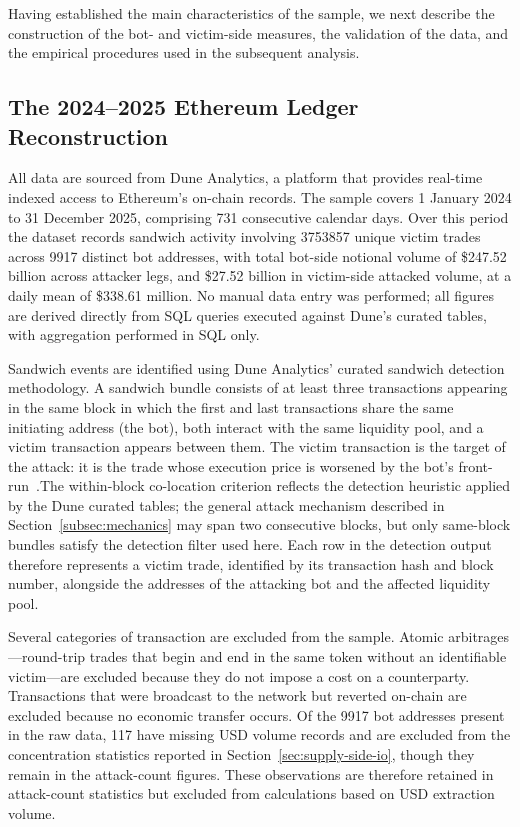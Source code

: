 \documentclass[pdflatex, sn-basic]{sn-jnl}
\theoremstyle{thmstylethree}%
\begin{document}
    Having established the main characteristics of the sample, we next describe the construction of the bot- and victim-side measures, the validation of the data, and the empirical procedures used in the subsequent analysis.

	\subsection{The 2024–2025 Ethereum Ledger
	Reconstruction}
	\label{subsec:ledger-reconstruction}

    All data are sourced from Dune Analytics, a platform that provides real-time indexed access to Ethereum's on-chain records.
    The sample covers 1 January 2024 to 31 December 2025, comprising \num{731} consecutive calendar days.
    Over this period the dataset records sandwich activity involving \num{3753857} unique victim trades across \num{9917} distinct bot addresses, with total bot-side notional volume of \$\num{247.52} billion across attacker legs, and \$\num{27.52} billion in victim-side attacked volume, at a daily mean of \$\num{338.61} million.
    No manual data entry was performed; all figures are derived directly from SQL queries executed against Dune's curated tables, with aggregation performed in SQL only.
    
    Sandwich events are identified using Dune Analytics' curated sandwich detection methodology.
    A sandwich bundle consists of at least three transactions appearing in the same block in which the first and last transactions share the same initiating address (the bot), both interact with the same liquidity pool, and a victim transaction appears between them.
    The victim transaction is the target of the attack: it is the trade whose execution price is worsened by the bot's front-run~\citep{Daian2020,Heimbach2022}.The within-block co-location criterion reflects the detection heuristic applied by the Dune curated tables; the general attack mechanism described in Section~\ref{subsec:mechanics} may span two consecutive blocks, but only same-block bundles satisfy the detection filter used here.
    Each row in the detection output therefore represents a victim trade, identified by its transaction hash and block number, alongside the addresses of the attacking bot and the affected liquidity pool.
    
    Several categories of transaction are excluded from the sample.
    Atomic arbitrages---round-trip trades that begin and end in the same token without an identifiable victim---are excluded because they do not impose a cost on a counterparty.
    Transactions that were broadcast to the network but reverted on-chain are excluded because no economic transfer occurs.
    Of the \num{9917} bot addresses present in the raw data, \num{117} have missing USD volume records and are excluded from the concentration statistics reported in Section~\ref{sec:supply-side-io}, though they remain in the attack-count figures.
    These observations are therefore retained in attack-count statistics but excluded from calculations based on USD extraction volume.
    
\end{document}
